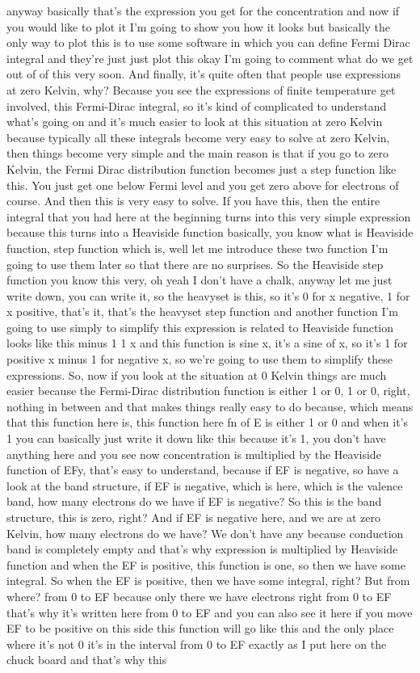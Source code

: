 anyway basically that's the expression you get for the concentration and now if you would like to plot it I'm going to show you how it looks but basically the only way to plot this is to use some software in which you can define Fermi Dirac integral and they're just just plot this okay I'm going to comment what do we get out of of this very soon. And finally, it's quite often that people use expressions at zero Kelvin, why? Because you see the expressions of finite temperature get involved, this Fermi-Dirac integral, so it's kind of complicated to understand what's going on and it's much easier to look at this situation at zero Kelvin because typically all these integrals become very easy to solve at zero Kelvin, then things become very simple and the main reason is that if you go to zero Kelvin, the Fermi Dirac distribution function becomes just a step function like this. You just get one below Fermi level and you get zero above for electrons of course. And then this is very easy to solve. If you have this, then the entire integral that you had here at the beginning turns into this very simple expression because this turns into a Heaviside function basically, you know what is Heaviside function, step function which is, well let me introduce these two function I'm going to use them later so that there are no surprises. So the Heaviside step function you know this very, oh yeah I don't have a chalk, anyway let me just write down, you can write it, so the heavyset is this, so it's 0 for x negative, 1 for x positive, that's it, that's the heavyset step function and another function I'm going to use simply to simplify this expression is related to Heaviside function looks like this minus 1 1 x and this function is sine x, it's a sine of x, so it's 1 for positive x minus 1 for negative x, so we're going to use them to simplify these expressions. So, now if you look at the situation at 0 Kelvin things are much easier because the Fermi-Dirac distribution function is either 1 or 0, 1 or 0, right, nothing in between and that makes things really easy to do because, which means that this function here is, this function here fn of E is either 1 or 0 and when it's 1 you can basically just write it down like this because it's 1, you don't have anything here and you see now concentration is multiplied by the Heaviside function of EFy, that's easy to understand, because if EF is negative, so have a look at the band structure, if EF is negative, which is here, which is the valence band, how many electrons do we have if EF is negative? So this is the band structure, this is zero, right? And if EF is negative here, and we are at zero Kelvin, how many electrons do we have? We don't have any because conduction band is completely empty and that's why expression is multiplied by Heaviside function and when the EF is positive, this function is one, so then we have some integral. So when the EF is positive, then we have some integral, right? But from where? from 0 to EF because only there we have electrons right from 0 to EF that's why it's written here from 0 to EF and you can also see it here if you move EF to be positive on this side this function will go like this and the only place where it's not 0 it's in the interval from 0 to EF exactly as I put here on the chuck board and that's why this 